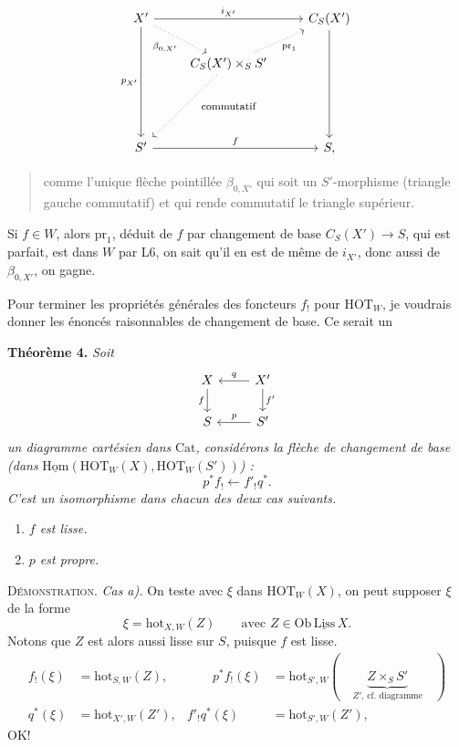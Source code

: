 \documentclass[11pt]{article}
\newcommand{\printedpage}[1]{\marginpar{\footnotesize p.~#1}}
\newcommand{\msp}[1]{\marginpar{\footnotesize [#1]}}
\newcommand{\HOT}{\mathrm{HOT}}
\newcommand{\hot}{\mathrm{hot}}
\newcommand{\Cat}{\mathrm{Cat}}
\newcommand{\pr}{\mathrm{pr}}
\newcommand{\Hom}{\mathrm{Hom}}
\begin{document}
\noindent\printedpage{99}%
\[
\begin{tikzcd}
X' \arrow[rr, "i_{X'}"] \arrow[ddd, "p_{X'}"'] \arrow[dr, dotted, "\beta_{0,X'}"'] & & C_S(X') \arrow[ddd] \\
& C_S(X') \times_S S' \arrow[ur, dotted, "\pr_1"'] \arrow[ddl, dotted] & \\
& \text{\footnotesize commutatif} & \\
S' \arrow[rr, "f"] & & S,
\end{tikzcd}
\]

\begin{quote}
comme l'unique flèche pointillée $\beta_{0,X'}$ qui soit un $S'$-morphisme (triangle gauche commutatif) et qui rende commutatif le triangle supérieur.
\end{quote}

Si $f \in W$, alors $\pr_1$, déduit de $f$ par changement de base $C_S(X') \longrightarrow S$, qui est parfait, est dans $W$ par L6, on sait qu'il en est de même de $i_{X'}$, donc aussi de $\beta_{0,X'}$, on gagne.

\msp{page 162}Pour terminer les propriétés générales des foncteurs $f_!$ pour $\HOT_W$, je voudrais donner les énoncés raisonnables de changement de base. Ce serait un

\noindent\textbf{Théorème 4.} \textit{Soit}
\[
\begin{tikzcd}
X \arrow[d, "f"'] & X' \arrow[l, "q"'] \arrow[d, "f'"] \\
S & S' \arrow[l, "p"']
\end{tikzcd}
\]
\textit{un diagramme cartésien dans} $\Cat$\textit{, considérons la flèche de changement de base (dans} $\underline{\Hom}(\HOT_W(X), \HOT_W(S'))$\textit{) :}
\[
p^* f_! \longleftarrow f'_! q^*.
\]
\textit{C'est un isomorphisme dans chacun des deux cas suivants.}

\begin{enumerate}
\item[\textit{a)}] \textit{$f$ est lisse.}
\item[\textit{b)}] \textit{$p$ est propre.}
\end{enumerate}

\textsc{Démonstration.} \textit{Cas a).} On teste avec $\xi$ dans $\HOT_W(X)$, on peut supposer $\xi$ de la forme
\[
\xi = \hot_{X,W}(Z) \qquad \text{avec } Z \in \mathrm{Ob}\, \underline{\mathrm{Liss}}\, X.
\]
Notons que $Z$ est alors aussi lisse sur $S$, puisque $f$ est lisse.
\[
\begin{aligned}
f_!(\xi) &= \hot_{S,W}(Z), &\qquad p^* f_!(\xi) &= \hot_{S',W}(\quad \underbrace{Z \times_S S'}_{\text{$Z'$, cf. diagramme}} \quad) \\
q^*(\xi) &= \hot_{X',W}(Z'), & f'_! q^*(\xi) &= \hot_{S',W}(Z'),
\end{aligned}
\]
OK!
\end{document}
